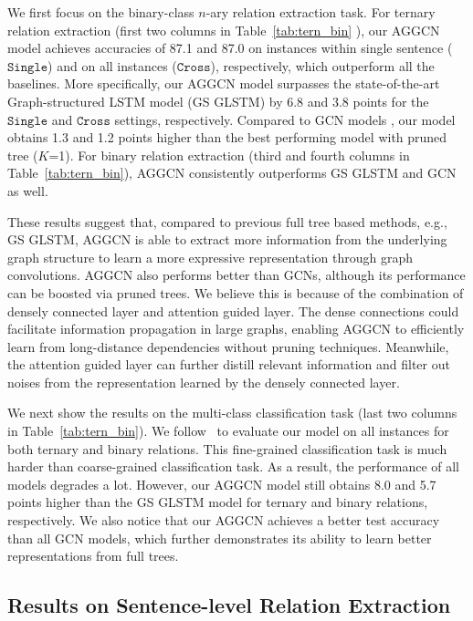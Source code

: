 \documentclass[11pt,a4paper]{article}
\begin{document}
We first focus on the binary-class $n$-ary relation extraction task.  For ternary relation extraction (first two columns in Table~\ref{tab:tern_bin} ), our AGGCN model achieves accuracies of 87.1 and 87.0  on instances within single sentence  ($\texttt{Single}$) and on all instances ($\texttt{Cross}$), respectively,  which outperform all the baselines. More specifically, our AGGCN model surpasses the state-of-the-art     Graph-structured LSTM model (GS GLSTM) by 6.8 and 3.8 points for the $\texttt{Single}$ and $\texttt{Cross}$ settings, respectively. Compared to GCN models , our model   obtains 1.3 and 1.2 points higher than the best performing model with pruned tree ($K$=1). For binary relation extraction (third and fourth columns in Table~\ref{tab:tern_bin}), AGGCN consistently outperforms GS GLSTM and GCN as well. 

These results suggest that, compared to previous full tree based methods, e.g., GS GLSTM,  AGGCN is able to extract more information from the underlying graph structure to learn a more expressive representation through graph convolutions. AGGCN also performs better than GCNs, although its performance can be boosted via pruned trees. We believe this is because of the combination of densely connected layer and attention guided layer. The dense connections could facilitate information propagation in large graphs, enabling AGGCN to efficiently learn from long-distance dependencies without pruning techniques. Meanwhile, the attention guided layer can further distill relevant information and filter out noises from the representation learned by the densely connected layer. 

We next show the results on the multi-class classification task (last two columns in Table~\ref{tab:tern_bin}). We follow~\citep{Song2018NaryRE} to evaluate our model on all instances for both ternary and binary relations. This fine-grained classification task is much harder than coarse-grained classification task. As a result,  the performance of all models degrades a lot. However, our AGGCN model still obtains 8.0 and 5.7  points  higher than the GS GLSTM model for ternary and binary relations, respectively. We also notice that our AGGCN achieves a better test accuracy than all GCN models, which further demonstrates its ability to learn better representations from full trees. 

\subsection{Results on Sentence-level Relation Extraction}
\end{document}
